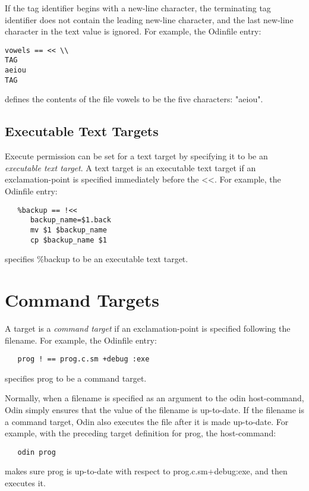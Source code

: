 If the tag identifier begins with a new-line character,
the terminating tag identifier does not contain the leading
new-line character,
and the last new-line character in the text value is ignored.
For example, the {\ex Odinfile} entry:
\begin{verbatim}
vowels == << \\
TAG
aeiou
TAG
\end{verbatim}
defines the contents of the file {\ex vowels} to be the
five characters: "{\ex aeiou}".

\subsection{Executable Text Targets}
\label{executabletarget}

Execute permission can be set for a text target by specifying
it to be an {\em executable text target}.
A text target is an executable text target
if an exclamation-point is specified immediately before the {\ex <<}.
For example, the {\ex Odinfile} entry:
\begin{verbatim}
   %backup == !<<
      backup_name=$1.back
      mv $1 $backup_name
      cp $backup_name $1
\end{verbatim}
specifies {\ex \%backup} to be an executable text target.


\section{Command Targets}
\label{commandtarget}

A target is a {\em command target}
if an exclamation-point is specified following the filename.
For example, the {\ex Odinfile} entry:
\begin{verbatim}
   prog ! == prog.c.sm +debug :exe
\end{verbatim}
specifies {\ex prog} to be a command target.

Normally, when a filename is specified as an argument
to the {\ex odin} host-command,
Odin simply ensures that the value of the filename is up-to-date.
If the filename is a command target,
Odin also executes the file after it is made up-to-date.
For example, with the preceding target definition for {\ex prog},
the host-command:
\begin{verbatim}
   odin prog
\end{verbatim}
makes sure {\ex prog} is up-to-date with respect to
{\ex prog.c.sm+debug:exe}, and then executes it.


